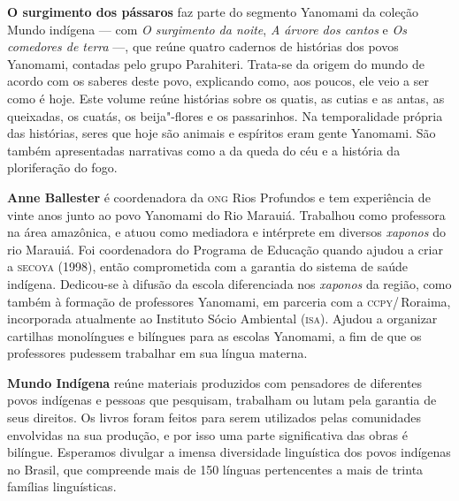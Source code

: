 \textbf{O surgimento dos pássaros} faz parte do segmento Yanomami da coleção Mundo indígena --- com \textit{O surgimento da noite}, \textit{A árvore dos cantos} e \textit{Os comedores de terra} ---, que reúne quatro cadernos de histórias dos povos Yanomami, contadas pelo grupo Parahiteri. Trata-se da origem do mundo de acordo com os saberes deste povo, explicando como, aos poucos, ele veio a ser como é hoje. Este volume reúne histórias sobre os quatis, as cutias e as antas, as queixadas, os cuatás, os beija"-flores e os passarinhos. Na temporalidade própria das histórias, seres que hoje são animais e espíritos eram gente Yanomami. São também apresentadas narrativas como a da queda do céu e a história da ploriferação do fogo. 

\textbf{Anne Ballester} é coordenadora da \textsc{ong} Rios Profundos e tem experiência de vinte anos junto ao povo Yanomami do Rio Marauiá. Trabalhou como professora na área amazônica, e atuou como mediadora e intérprete em diversos \textit{xaponos} do rio Marauiá. Foi coordenadora do Programa de Educação quando ajudou a criar a \textsc{secoya} (1998), então comprometida com a garantia do sistema de saúde indígena. Dedicou-se à difusão da escola diferenciada nos \textit{xaponos} da região, como também à formação de professores Yanomami, em parceria com a \textsc{ccpy}/\,Roraima, incorporada atualmente ao Instituto Sócio Ambiental (\textsc{isa}). Ajudou a organizar cartilhas monolíngues e bilíngues para as escolas Yanomami, a fim de que os professores pudessem trabalhar em sua língua materna.

\textbf{Mundo Indígena} reúne materiais produzidos com pensadores de diferentes povos indígenas e pessoas que pesquisam, trabalham ou lutam pela garantia de seus direitos. Os livros foram feitos para serem utilizados pelas comunidades envolvidas na sua produção, e por isso uma parte significativa das obras é bilíngue. Esperamos divulgar a imensa diversidade linguística dos povos indígenas no Brasil, que compreende mais de 150 línguas pertencentes a mais de trinta famílias linguísticas.



